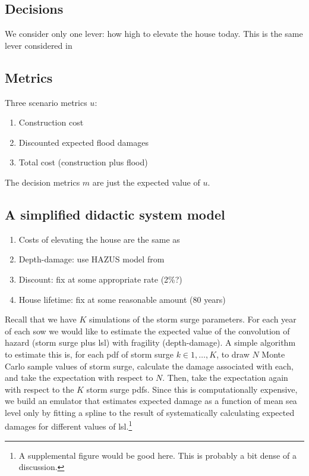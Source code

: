 \documentclass[12pt]{article}
\begin{document}
\subsection{Decisions}

We consider only one lever: how high to elevate the house today.
This is the same lever considered in \citet{zarekarizi_suboptimal:2020}

\subsection{Metrics}

Three scenario metrics $u$:
\begin{enumerate}
    \item Construction cost
    \item Discounted expected flood damages
    \item Total cost (construction plus flood)
\end{enumerate}
The decision metrics $m$ are just the expected value of $u$.

\subsection{A simplified didactic system model}

\begin{enumerate}
    \item Costs of elevating the house are the same as \citet{zarekarizi_suboptimal:2020}
    \item Depth-damage: use HAZUS model from \citet{zarekarizi_suboptimal:2020}
    \item Discount: fix at some appropriate rate (2\%?)
    \item House lifetime: fix at some reasonable amount (80 years)
\end{enumerate}

Recall that we have $K$ simulations of the storm surge parameters.
For each year of each \gls{sow} we would like to estimate the expected value of the convolution of hazard (storm surge plus \gls{lsl}) with fragility (depth-damage).
A simple algorithm to estimate this is, for each \gls{pdf} of storm surge $k \in 1, \ldots, K$, to draw $N$ Monte Carlo sample values of storm surge, calculate the damage associated with each, and take the expectation with respect to $N$.
Then, take the expectation again with respect to the $K$ storm surge \glspl{pdf}.
Since this is computationally expensive, we build an emulator that estimates expected damage as a function of mean sea level only by fitting a spline to the result of systematically calculating expected damages for different values of \gls{lsl}.\footnote{A supplemental figure would be good here. This is probably a bit dense of a discussion.}
\end{document}
